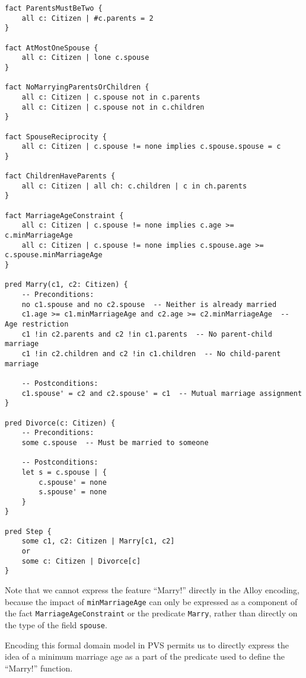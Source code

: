 \documentclass[10pt,letterpaper]{article}
\begin{document}
\begin{lstlisting}
fact ParentsMustBeTwo {
    all c: Citizen | #c.parents = 2
}

fact AtMostOneSpouse {
    all c: Citizen | lone c.spouse
}

fact NoMarryingParentsOrChildren {
    all c: Citizen | c.spouse not in c.parents
    all c: Citizen | c.spouse not in c.children
}

fact SpouseReciprocity {
    all c: Citizen | c.spouse != none implies c.spouse.spouse = c
}

fact ChildrenHaveParents {
    all c: Citizen | all ch: c.children | c in ch.parents
}

fact MarriageAgeConstraint {
    all c: Citizen | c.spouse != none implies c.age >= c.minMarriageAge
    all c: Citizen | c.spouse != none implies c.spouse.age >= c.spouse.minMarriageAge
}

pred Marry(c1, c2: Citizen) {
    -- Preconditions:
    no c1.spouse and no c2.spouse  -- Neither is already married
    c1.age >= c1.minMarriageAge and c2.age >= c2.minMarriageAge  -- Age restriction
    c1 !in c2.parents and c2 !in c1.parents  -- No parent-child marriage
    c1 !in c2.children and c2 !in c1.children  -- No child-parent marriage

    -- Postconditions:
    c1.spouse' = c2 and c2.spouse' = c1  -- Mutual marriage assignment
}

pred Divorce(c: Citizen) {
    -- Preconditions:
    some c.spouse  -- Must be married to someone

    -- Postconditions:
    let s = c.spouse | {
        c.spouse' = none
        s.spouse' = none
    }
}

pred Step {
    some c1, c2: Citizen | Marry[c1, c2]
    or
    some c: Citizen | Divorce[c]
}
\end{lstlisting}

Note that we cannot express the feature ``Marry!'' directly in the Alloy encoding, because the impact of \verb+minMarriageAge+ can only be expressed as a component of the fact \verb+MarriageAgeConstraint+ or the predicate \verb+Marry+, rather than directly on the type of the field \verb+spouse+.

Encoding this formal domain model in PVS permits us to directly express the idea of a minimum marriage age as a part of the predicate used to define the ``Marry!'' function.
\end{document}
